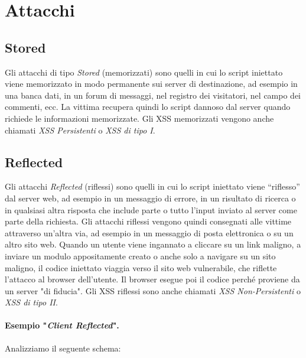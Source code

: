 \section{Attacchi}

\subsection{Stored}

Gli attacchi di tipo \textit{Stored} (memorizzati) sono quelli in cui lo
script iniettato viene memorizzato in
modo permanente sui server di destinazione, ad esempio in una banca dati,
in un forum di
messaggi, nel registro dei visitatori, nel campo dei commenti, ecc.
La vittima recupera quindi lo script dannoso dal server quando richiede le
informazioni memorizzate.
Gli XSS memorizzati vengono anche chiamati \textit{XSS Persistenti} o
\textit{XSS di tipo I}.

\subsection{Reflected}

Gli attacchi \textit{Reflected} (riflessi) sono quelli in cui lo script iniettato
viene “riflesso” dal server web, ad
esempio in un messaggio di errore, in un risultato di ricerca o in qualsiasi altra
risposta che
include parte o tutto l'input inviato al server come parte della richiesta.
Gli attacchi riflessi
vengono quindi consegnati alle vittime attraverso un'altra via, ad esempio in un
messaggio di
posta elettronica o su un altro sito web.
Quando un utente viene ingannato a cliccare su un link maligno, a inviare un modulo
appositamente creato o anche solo a navigare su un sito maligno, il codice
iniettato viaggia
verso il sito web vulnerabile, che riflette l'attacco al browser dell'utente.
Il browser esegue poi il codice perché proviene da un server "di fiducia".
Gli XSS riflessi
sono anche chiamati \textit{XSS Non-Persistenti} o \textit{XSS di tipo II}.

\paragraph{Esempio "\textit{Client Reflected}".}
Analizziamo il seguente schema:

